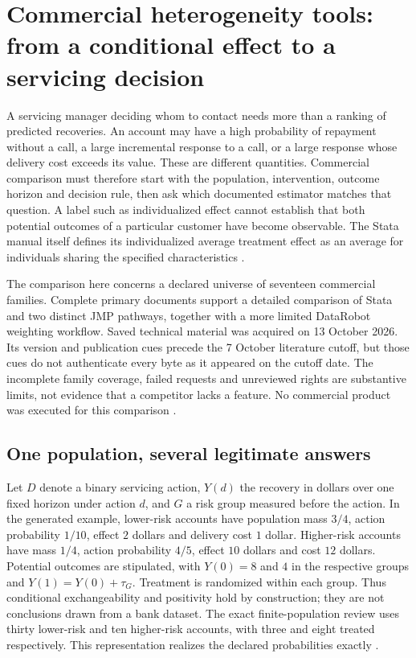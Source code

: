 \section{Commercial heterogeneity tools: from a conditional effect to a servicing decision}
\label{exec13:commercial-heterogeneity}

A servicing manager deciding whom to contact needs more than a ranking of
predicted recoveries. An account may have a high probability of repayment
without a call, a large incremental response to a call, or a large response
whose delivery cost exceeds its value. These are different quantities.
Commercial comparison must therefore start with the population, intervention,
outcome horizon and decision rule, then ask which documented estimator matches
that question. A label such as individualized effect cannot establish that
both potential outcomes of a particular customer have become observable.
The Stata manual itself defines its individualized average treatment effect
as an average for individuals sharing the specified characteristics
\cite{exec13_ch_stata}.

The comparison here concerns a declared universe of seventeen commercial
families. Complete primary documents support a detailed comparison of Stata
and two distinct JMP pathways, together with a more limited DataRobot
weighting workflow. Saved technical material was acquired on 13 October 2026.
Its version and publication cues precede the 7 October literature cutoff,
but those cues do not authenticate every byte as it appeared on the cutoff
date. The incomplete family coverage, failed requests and unreviewed rights
are substantive limits, not evidence that a competitor lacks a feature.
No commercial product was executed for this comparison
\cite{exec13_ch_scope}.

\subsection{One population, several legitimate answers}

Let $D$ denote a binary servicing action, $Y(d)$ the recovery in dollars over
one fixed horizon under action $d$, and $G$ a risk group measured before the
action. In the generated example, lower-risk accounts have population mass
$3/4$, action probability $1/10$, effect $2$ dollars and delivery cost $1$
dollar. Higher-risk accounts have mass $1/4$, action probability $4/5$, effect
$10$ dollars and cost $12$ dollars. Potential outcomes are stipulated, with
$Y(0)=8$ and $4$ in the respective groups and $Y(1)=Y(0)+\tau_G$. Treatment
is randomized within each group. Thus conditional exchangeability and
positivity hold by construction; they are not conclusions drawn from a bank
dataset. The exact finite-population review uses thirty lower-risk and ten
higher-risk accounts, with three and eight treated respectively. This
representation realizes the declared probabilities exactly
\cite{exec13_ch_exact}.

